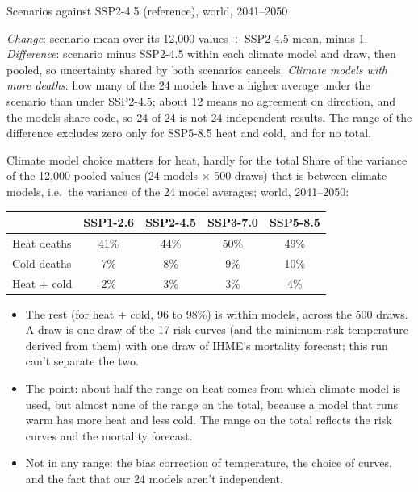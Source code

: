 \documentclass[aspectratio=169,11pt]{beamer}
\begin{document}
\begin{frame}{Scenarios against SSP2-4.5 (reference), world, 2041--2050}
  \smallskip
  \raggedright\scriptsize
  \emph{Change}: scenario mean over its 12,000 values $\div$ SSP2-4.5 mean, minus 1. \emph{Difference}: scenario minus SSP2-4.5 within each climate model and draw, then pooled, so uncertainty shared by both scenarios cancels. \emph{Climate models with more deaths}: how many of the 24 models have a higher average under the scenario than under SSP2-4.5; about 12 means no agreement on direction, and the models share code, so 24 of 24 is not 24 independent results.
  The range of the difference excludes zero only for SSP5-8.5 heat and cold, and for no total.
\end{frame}

\begin{frame}{Climate model choice matters for heat, hardly for the total}
  \small
  Share of the variance of the 12,000 pooled values (24 models $\times$ 500 draws) that is between climate models, i.e.\ the variance of the 24 model averages; world, 2041--2050:

  \medskip
  \centering
  \begin{tabular}{lcccc}
    \toprule
    & SSP1-2.6 & SSP2-4.5 & SSP3-7.0 & SSP5-8.5 \\
    \midrule
    Heat deaths & 41\% & 44\% & 50\% & 49\% \\
    Cold deaths & 7\% & 8\% & 9\% & 10\% \\
    Heat + cold & 2\% & 3\% & 3\% & 4\% \\
    \bottomrule
  \end{tabular}

  \medskip
  \raggedright\footnotesize
  \begin{itemize}
    \item The rest (for heat + cold, 96 to 98\%) is within models, across the 500 draws. A draw is one draw of the 17 risk curves (and the minimum-risk temperature derived from them) with one draw of IHME's mortality forecast; this run can't separate the two.
    \item The point: about half the range on heat comes from which climate model is used, but almost none of the range on the total, because a model that runs warm has more heat and less cold. The range on the total reflects the risk curves and the mortality forecast.
    \item Not in any range: the bias correction of temperature, the choice of curves, and the fact that our 24 models aren't independent.
  \end{itemize}
\end{frame}
\end{document}
